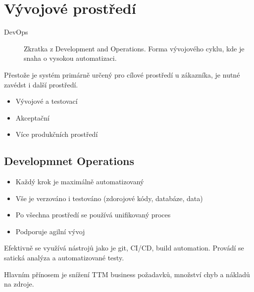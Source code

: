 \section{Vývojové prostředí}
  \begin{description}
    \item[DevOps] Zkratka z Development and Operations. Forma vývojového cyklu, kde je snaha o vysokou automatizaci.
  \end{description}
  Přestože je systém primárně určený pro cílové prostředí u zákazníka, je nutné zavédst i další prostředí.

  \begin{itemize}
    \item Vývojové a testovací
    \item Akceptační
    \item Více produkčních prostředí
  \end{itemize}

  \subsection{Developmnet Operations}
    \begin{itemize}
      \item Každý krok je maximálně automatizovaný
      \item Vše je verzováno i testováno (zdorojové kódy, databáze, data)
      \item Po všechna prostředí se používá unifikovaný proces
      \item Podporuje agilní vývoj
    \end{itemize}

    Efektivně se využívá nástrojů jako je git, CI/CD, build automation. Provádí se satická analýza a automatizované testy.

    Hlavním přínosem je snížení TTM business požadavků, množství chyb a nákladů na zdroje.    
